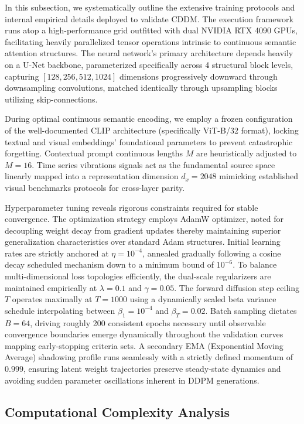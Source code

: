 In this subsection, we systematically outline the extensive training protocols and internal empirical details deployed to validate CDDM. The execution framework runs atop a high-performance grid outfitted with dual NVIDIA RTX 4090 GPUs, facilitating heavily parallelized tensor operations intrinsic to continuous semantic attention structures. The neural network's primary architecture depends heavily on a U-Net backbone, parameterized specifically across 4 structural block levels, capturing $[128, 256, 512, 1024]$ dimensions progressively downward through downsampling convolutions, matched identically through upsampling blocks utilizing skip-connections.

During optimal continuous semantic encoding, we employ a frozen configuration of the well-documented CLIP architecture (specifically ViT-B/32 format), locking textual and visual embeddings' foundational parameters to prevent catastrophic forgetting. Contextual prompt continuous lengths $M$ are heuristically adjusted to $M=16$. Time series vibrations signals act as the fundamental source space linearly mapped into a representation dimension $d_x = 2048$ mimicking established visual benchmarks protocols for cross-layer parity.

Hyperparameter tuning reveals rigorous constraints required for stable convergence. The optimization strategy employs AdamW optimizer, noted for decoupling weight decay from gradient updates thereby maintaining superior generalization characteristics over standard Adam structures. Initial learning rates are strictly anchored at $\eta=10^{-4}$, annealed gradually following a cosine decay scheduled mechanism down to a minimum bound of $10^{-6}$. To balance multi-dimensional loss topologies efficiently, the dual-scale regularizers are maintained empirically at $\lambda=0.1$ and $\gamma=0.05$. The forward diffusion step ceiling $T$ operates maximally at $T=1000$ using a dynamically scaled beta variance schedule interpolating between $\beta_1 = 10^{-4}$ and $\beta_T = 0.02$. Batch sampling dictates $B=64$, driving roughly 200 consistent epochs necessary until observable convergence boundaries emerge dynamically throughout the validation curves mapping early-stopping criteria sets. A secondary EMA (Exponential Moving Average) shadowing profile runs seamlessly with a strictly defined momentum of $0.999$, ensuring latent weight trajectories preserve steady-state dynamics and avoiding sudden parameter oscillations inherent in DDPM generations.

\subsection{Computational Complexity Analysis}
\label{subsec:complexity}

